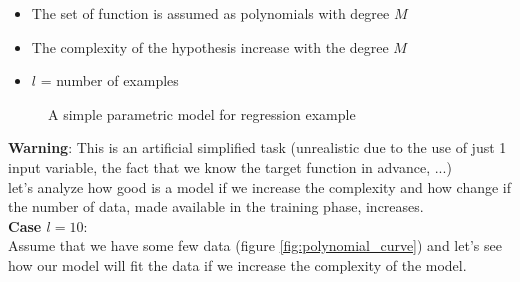\documentclass[../main.tex]{subfiles}
\begin{document}
\begin{itemize}
    \item The set of function is assumed as polynomials with degree $M$
    \item The complexity of the hypothesis increase with the degree $M$
    \item $l$ = number of examples
\end{itemize}

\begin{figure}[H]
  \centering
  \hfill
  \caption{A simple parametric model for regression example}
\end{figure}

\textbf{Warning}: This is an artificial simplified task (unrealistic due to the use of just 1 input variable, the fact that we know the target function in advance, ...)\\

let's analyze how good is a model if we increase the complexity and how change if the number of data, made available in the training phase, increases.\\

\noindent \textbf{Case $l = 10$}:\\
Assume that we have some few data  (figure \ref{fig:polynomial_curve}) and let's see how our model will fit the data if we increase the complexity of the model.\\
\end{document}
